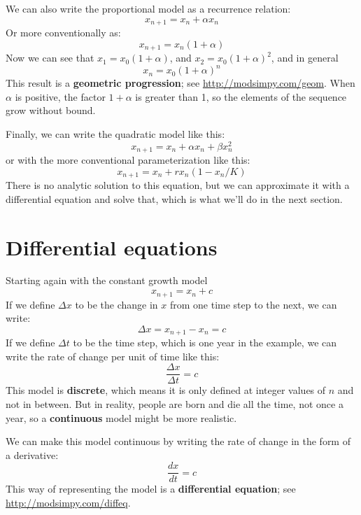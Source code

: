 \documentclass[12pt]{book}
\theoremstyle{exercise}
\begin{document}
We can also write the proportional model as a recurrence relation:
%
\[ x_{n+1} = x_n + \alpha x_n \]
%
Or more conventionally as:
%
\[ x_{n+1} = x_n (1 + \alpha) \]
%
Now we can see that $x_1 = x_0 (1 + \alpha)$, and $x_2 = x_0 (1 + \alpha)^2$, and in general
%
\[ x_n = x_0 (1 + \alpha)^n \]
%
This result is a {\bf geometric progression}; see \url{http://modsimpy.com/geom}.  When $\alpha$ is positive, the factor $1+\alpha$ is greater than 1, so the elements of the sequence grow without bound.

Finally, we can write the quadratic model like this:
%
\[ x_{n+1} = x_n + \alpha x_n + \beta x_n^2 \]
%
or with the more conventional parameterization like this:
%
\[ x_{n+1} = x_n + r x_n (1 - x_n / K) \]
%
There is no analytic solution to this equation, but we can approximate it with a differential equation and solve that, which is what we'll do in the next section.


\section{Differential equations}
\label{diffeq}

Starting again with the constant growth model
%
\[ x_{n+1} = x_n + c \]
%
If we define $\Delta x$ to be the change in $x$ from one time step to the next, we can write:
%
\[ \Delta x = x_{n+1} - x_n = c \]
%
If we define $\Delta t$ to be the time step, which is one year in the example, we can write the rate of change per unit of time like this:
%
\[ \frac{\Delta x}{\Delta t} = c \]
%
This model is {\bf discrete}, which means it is only defined at integer values of $n$ and not in between.  But in reality, people are born and die all the time, not once a year, so a {\bf continuous} model might be more realistic.

We can make this model continuous by writing the rate of change in the form of a derivative:
%
\[ \frac{dx}{dt} = c \]
%
This way of representing the model is a {\bf differential equation}; see \url{http://modsimpy.com/diffeq}.
\end{document}
